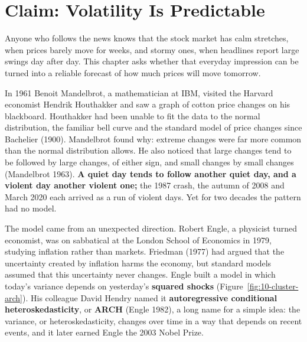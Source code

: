 \makeatletter
{}
\makeatother

\chapter{Claim: Volatility Is Predictable}
\label{ch:10}

Anyone who follows the news knows that the stock market has calm stretches, when prices barely move for weeks, and stormy ones, when headlines report large swings day after day. This chapter asks whether that everyday impression can be turned into a reliable forecast of how much prices will move tomorrow.

In 1961 Benoit Mandelbrot, a mathematician at IBM, visited the Harvard economist Hendrik Houthakker and saw a graph of cotton price changes on his blackboard. Houthakker had been unable to fit the data to the normal distribution, the familiar bell curve and the standard model of price changes since Bachelier (1900). Mandelbrot found why: extreme changes were far more common than the normal distribution allows. He also noticed that large changes tend to be followed by large changes, of either sign, and small changes by small changes (Mandelbrot 1963). \textbf{A quiet day tends to follow another quiet day, and a violent day another violent one;} the 1987 crash, the autumn of 2008 and March 2020 each arrived as a run of violent days. Yet for two decades the pattern had no model.

The model came from an unexpected direction. Robert Engle, a physicist turned economist, was on sabbatical at the London School of Economics in 1979, studying inflation rather than markets. Friedman (1977) had argued that the uncertainty created by inflation harms the economy, but standard models assumed that this uncertainty never changes. Engle built a model in which today's variance depends on yesterday's \textbf{squared shocks} (Figure~\ref{fig:10-cluster-arch}). His colleague David Hendry named it \textbf{autoregressive conditional heteroskedasticity}, or \textbf{ARCH} (Engle 1982), a long name for a simple idea: the variance, or heteroskedasticity, changes over time in a way that depends on recent events, and it later earned Engle the 2003 Nobel Prize.

